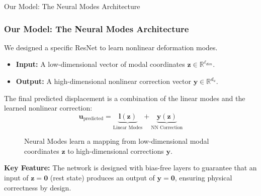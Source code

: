 \documentclass{beamer}
\begin{document}
\begin{frame}{Our Model: The Neural Modes Architecture}
    \frametitle{Our Model: The Neural Modes Architecture}
    
    We designed a specific ResNet to learn nonlinear deformation modes.
    
    \begin{itemize}
        \item \textbf{Input:} A low-dimensional vector of modal coordinates \( \mathbf{z} \in \mathbb{R}^{\ell_{dim}} \).
        \item \textbf{Output:} A high-dimensional nonlinear correction vector \( \bm{y} \in \mathbb{R}^{d_u} \).
    \end{itemize}
    
    The final predicted displacement is a combination of the linear modes and the learned nonlinear correction:
    \begin{equation*}
        \bm{u}_{\text{predicted}} = \underbrace{\bm{l}(\mathbf{z})}_{\text{Linear Modes}} + \underbrace{\bm{y}(\mathbf{z})}_{\text{NN Correction}}
    \end{equation*}
    
    \begin{figure}
        \centering
        \caption{Neural Modes learn a mapping from low-dimensional modal coordinates \(\mathbf{z}\) to high-dimensional corrections \(\bm{y}\).}
        \label{fig:neural_modes_arch}
    \end{figure}
    
    \textbf{Key Feature:} The network is designed with bias-free layers to guarantee that an input of \(\mathbf{z}=\bm{0}\) (rest state) produces an output of \(\bm{y}=\bm{0}\), ensuring physical correctness by design.
\end{frame}
\end{document}
